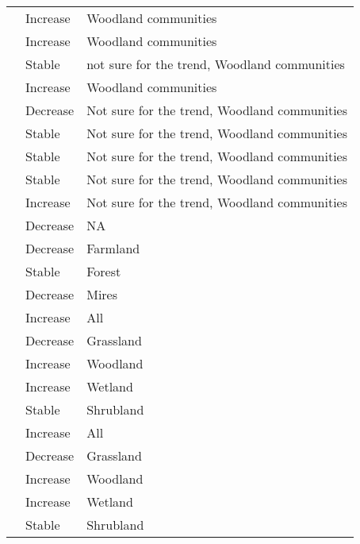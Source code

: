 \documentclass[
  12pt,
  oneside]{report}
\begin{document}
\begin{landscape}
\begin{longtable}[t]{ll>{\raggedright\arraybackslash}p{40em}}
\cite{harrison_assessing_2014} & Increase & Woodland \vphantom{2} communities\\
\addlinespace
\cite{harrison_assessing_2014} & Increase & Woodland \vphantom{1} communities\\
\cite{harrison_assessing_2014} & Stable & not sure for the trend, Woodland communities\\
\cite{harrison_assessing_2014} & Increase & Woodland communities\\
\cite{harrison_assessing_2014} & Decrease & Not sure for the trend, Woodland communities\\
\cite{harrison_assessing_2014} & Stable & Not sure for the trend, Woodland \vphantom{2} communities\\
\addlinespace
\cite{harrison_assessing_2014} & Stable & Not sure for the trend, Woodland \vphantom{1} communities\\
\cite{harrison_assessing_2014} & Stable & Not sure for the trend, Woodland communities\\
\cite{harrison_assessing_2014} & Increase & Not sure for the trend, Woodland communities\\
\cite{juslen_application_2013} & Decrease & NA\\
\cite{normander_indicator_2012} & Decrease & Farmland\\
\addlinespace
\cite{normander_indicator_2012} & Stable & Forest\\
\cite{normander_indicator_2012} & Decrease & Mires\\
\cite{schipper_contrasting_2016} & Increase & \vphantom{6} All\\
\cite{schipper_contrasting_2016} & Decrease & \vphantom{3} Grassland\\
\cite{schipper_contrasting_2016} & Increase & \vphantom{5} Woodland\\
\addlinespace
\cite{schipper_contrasting_2016} & Increase & \vphantom{6} Wetland\\
\cite{schipper_contrasting_2016} & Stable & \vphantom{1} Shrubland\\
\cite{schipper_contrasting_2016} & Increase & \vphantom{5} All\\
\cite{schipper_contrasting_2016} & Decrease & \vphantom{2} Grassland\\
\cite{schipper_contrasting_2016} & Increase & \vphantom{4} Woodland\\
\addlinespace
\cite{schipper_contrasting_2016} & Increase & \vphantom{5} Wetland\\
\cite{schipper_contrasting_2016} & Stable & Shrubland\\

\end{longtable}
\end{landscape}
\end{document}
